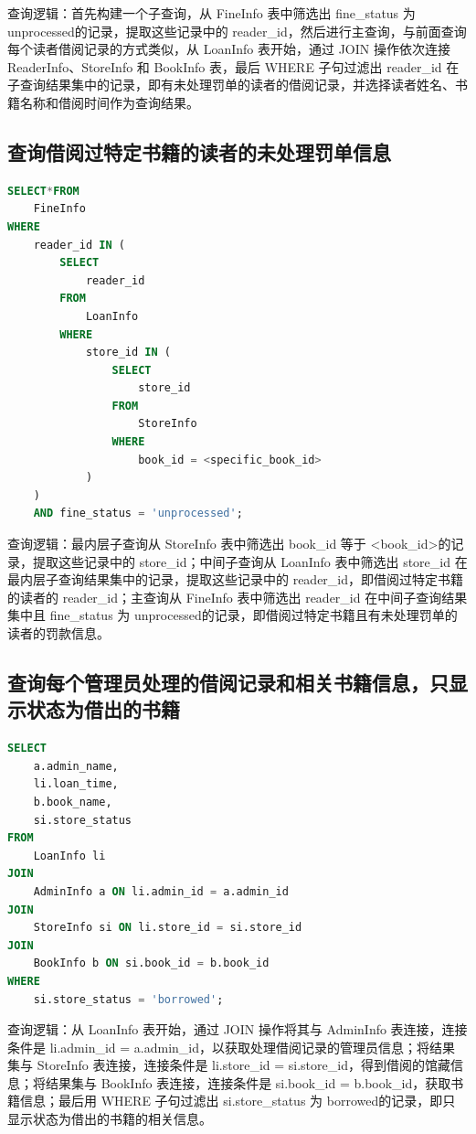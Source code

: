 \documentclass[a4paper,14pt]{article}
\begin{document}
查询逻辑：首先构建一个子查询，从 FineInfo 表中筛选出 fine\_status 为 unprocessed的记录，提取这些记录中的 reader\_id，然后进行主查询，与前面查询每个读者借阅记录的方式类似，从 LoanInfo 表开始，通过 JOIN 操作依次连接 ReaderInfo、StoreInfo 和 BookInfo 表，最后 WHERE 子句过滤出 reader\_id 在子查询结果集中的记录，即有未处理罚单的读者的借阅记录，并选择读者姓名、书籍名称和借阅时间作为查询结果。

\subsection{查询借阅过特定书籍的读者的未处理罚单信息}
\begin{lstlisting}[language=sql, breaklines=true]
SELECT*FROM 
    FineInfo
WHERE 
    reader_id IN (
        SELECT 
            reader_id 
        FROM 
            LoanInfo 
        WHERE 
            store_id IN (
                SELECT 
                    store_id 
                FROM 
                    StoreInfo 
                WHERE 
                    book_id = <specific_book_id>
            )
    )
    AND fine_status = 'unprocessed';
\end{lstlisting}

查询逻辑：最内层子查询从 StoreInfo 表中筛选出 book\_id 等于 <book\_id>的记录，提取这些记录中的 store\_id；中间子查询从 LoanInfo 表中筛选出 store\_id 在最内层子查询结果集中的记录，提取这些记录中的 reader\_id，即借阅过特定书籍的读者的 reader\_id；主查询从 FineInfo 表中筛选出 reader\_id 在中间子查询结果集中且 fine\_status 为 unprocessed的记录，即借阅过特定书籍且有未处理罚单的读者的罚款信息。


\subsection{查询每个管理员处理的借阅记录和相关书籍信息，只显示状态为借出的书籍}
\begin{lstlisting}[language=sql, breaklines=true]
SELECT 
    a.admin_name,
    li.loan_time,
    b.book_name,
    si.store_status
FROM 
    LoanInfo li
JOIN 
    AdminInfo a ON li.admin_id = a.admin_id
JOIN 
    StoreInfo si ON li.store_id = si.store_id
JOIN 
    BookInfo b ON si.book_id = b.book_id
WHERE 
    si.store_status = 'borrowed';
\end{lstlisting}

查询逻辑：从 LoanInfo 表开始，通过 JOIN 操作将其与 AdminInfo 表连接，连接条件是 li.admin\_id = a.admin\_id，以获取处理借阅记录的管理员信息；将结果集与 StoreInfo 表连接，连接条件是 li.store\_id = si.store\_id，得到借阅的馆藏信息；将结果集与 BookInfo 表连接，连接条件是 si.book\_id = b.book\_id，获取书籍信息；最后用 WHERE 子句过滤出 si.store\_status 为 borrowed的记录，即只显示状态为借出的书籍的相关信息。
\end{document}
